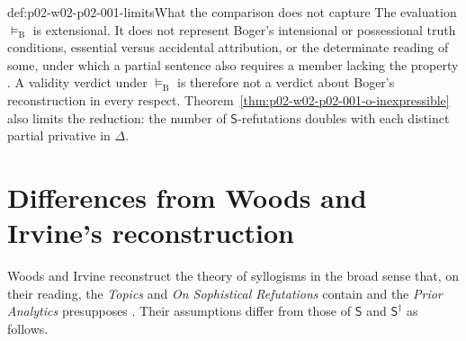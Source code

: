 \begin{hbwarning}{def:p02-w02-p02-001-limits}{What the comparison does not capture}
The evaluation \(\models_{\mathrm B}\) is extensional. It does not
represent Boger's intensional or possessional truth conditions, essential
versus accidental attribution, or the determinate reading of some, under
which a partial sentence also requires a member lacking the property
\cite[pp.~147--148, 164--165]{Boger2004UnderlyingLogic}. A validity verdict
under \(\models_{\mathrm B}\) is therefore not a verdict about Boger's
reconstruction in every respect. Theorem~\ref{thm:p02-w02-p02-001-o-inexpressible}
also limits the reduction: the number of \(\mathsf S\)-refutations doubles
with each distinct partial privative in \(\Delta\).
\end{hbwarning}

\section{Differences from Woods and Irvine's reconstruction}
\label{sec:p02-w02-p02-001-woods-irvine}

Woods and Irvine reconstruct the theory of syllogisms in the broad sense
that, on their reading, the \emph{Topics} and \emph{On Sophistical
Refutations} contain and the \emph{Prior Analytics} presupposes
\cite[pp.~38, 51--56]{WoodsIrvine2004EarlyLogic}. Their assumptions differ
from those of \(\mathsf S\) and \(\mathsf S^\dagger\) as follows.

